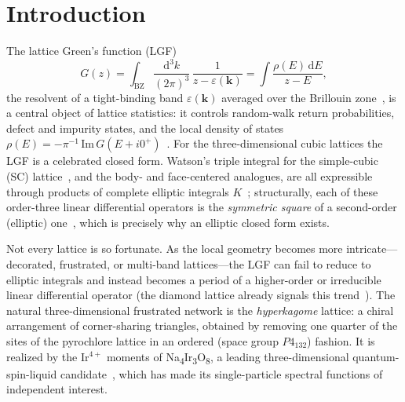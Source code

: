 \documentclass[cntp]{ipart}
\newcommand{\rmd}{\mathrm{d}}
\theoremstyle{plain}
\theoremstyle{remark}
\begin{document}
\begin{frontmatter}
\begin{keyword}[class=MSC]
\end{keyword}

\begin{keyword}
\end{keyword}

\end{frontmatter}

\section{Introduction}
The lattice Green's function (LGF)
\begin{equation}
G(z)=\int_{\mathrm{BZ}}\frac{\rmd^3k}{(2\pi)^3}\,\frac{1}{z-\varepsilon(\bm k)}
=\int\frac{\rho(E)\,\rmd E}{z-E},
\label{eq:lgf}
\end{equation}
the resolvent of a tight-binding band $\varepsilon(\bm k)$ averaged over the Brillouin zone~\cite{AshcroftMermin}, is a central object
of lattice statistics: it controls random-walk return probabilities, defect and impurity states, and the local
density of states $\rho(E)=-\pi^{-1}\,\mathrm{Im}\,G(E+i0^+)$~\cite{Economou,Guttmann2010}. For the
three-dimensional cubic lattices the LGF is a celebrated closed form. Watson's triple
integral for the simple-cubic (SC) lattice~\cite{Watson1939}, and the body- and face-centered analogues, are all
expressible through products of complete elliptic integrals $K$~\cite{Joyce1973,GlasserZucker1977,Joyce1998}; structurally,
each of these order-three linear differential operators is the \emph{symmetric square} of a second-order
(elliptic) one~\cite{BoukraaHassaniMaillard2014}, which is precisely why an elliptic closed form exists.

Not every lattice is so fortunate. As the local geometry becomes more intricate---decorated, frustrated, or
multi-band lattices---the LGF can fail to reduce to elliptic integrals and instead becomes a period of a
higher-order or irreducible linear differential operator (the diamond lattice already signals this
trend~\cite{Guttmann2010,Joyce1998}). The natural three-dimensional frustrated network is the
\emph{hyperkagome} lattice: a chiral arrangement of corner-sharing triangles, obtained by removing one quarter
of the sites of the pyrochlore lattice in an ordered (space group $P4_132$) fashion. It is realized by the Ir$^{4+}$
moments of Na\textsubscript{4}Ir\textsubscript{3}O\textsubscript{8}, a leading three-dimensional quantum-spin-liquid candidate~\cite{Okamoto2007,
Hopkinson2007,Lawler2008}, which has made its single-particle spectral functions of independent interest.
\end{document}
